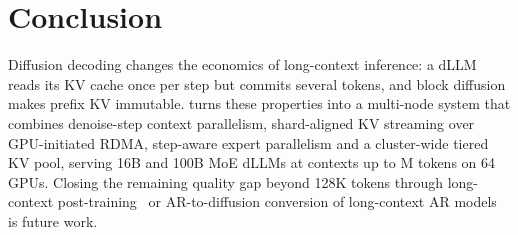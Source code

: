 \section{Conclusion}
\label{sec:conclusion}

Diffusion decoding changes the economics of long-context inference: a dLLM reads its KV cache once
per step but commits several tokens, and block diffusion makes prefix KV immutable. \sys turns these
properties into a multi-node system that combines denoise-step context parallelism, shard-aligned KV
streaming over GPU-initiated RDMA, step-aware expert parallelism and a cluster-wide tiered KV pool,
serving 16B and 100B MoE dLLMs at contexts up to M tokens on 64 GPUs. Closing the remaining
quality gap beyond 128K tokens through long-context post-training~\cite{he2025ultrallada} or
AR-to-diffusion conversion of long-context AR models~\cite{wu2025fastdllmv2} is future work.
